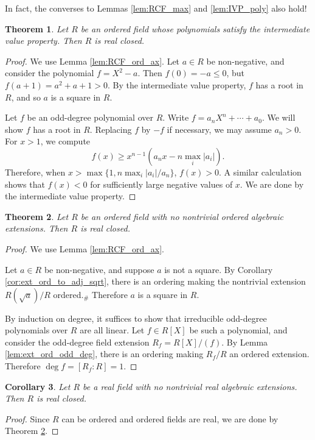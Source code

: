 \documentclass[a4paper]{report}
\newtheorem{theorem}{Theorem}
\newtheorem{corollary}[theorem]{Corollary}
\theoremstyle{definition}
\begin{document}
In fact, the converses to Lemmas \ref{lem:RCF_max} and \ref{lem:IVP_poly} also hold!

\begin{theorem}
  \label{thm:IVP_poly_imp_RCF}
  Let $R$ be an ordered field whose polynomials satisfy the intermediate value property. Then $R$ is real closed.
\end{theorem}
\begin{proof}
  We use Lemma \ref{lem:RCF_ord_ax}. Let $a\in R$ be non-negative, and consider the polynomial $f=X^2-a$. Then $f(0)=-a\leq0$, but $f(a+1)=a^2+a+1>0$. By the intermediate value property, $f$ has a root in $R$, and so $a$ is a square in $R$.

  Let $f$ be an odd-degree polynomial over $R$. Write $f=a_nX^n+\cdots+a_0$. We will show $f$ has a root in $R$. Replacing $f$ by $-f$ if necessary, we may assume $a_n>0$. For $x>1$, we compute
  \[f(x)\geq x^{n-1}(a_nx-n\max_i|a_i|).\]
  Therefore, when $x>\max\{1,n\max_i|a_i|/a_n\}$, $f(x)>0$. A similar calculation shows that $f(x)<0$ for sufficiently large negative values of $x$. We are done by the intermediate value property.
\end{proof}

\begin{theorem}
  \label{thm:ord_max_imp_RCF}
  Let $R$ be an ordered field with no nontrivial ordered algebraic extensions. Then $R$ is real closed.
\end{theorem}
\begin{proof}
  We use Lemma \ref{lem:RCF_ord_ax}. 

  Let $a\in R$ be non-negative, and suppose $a$ is not a square. By Corollary \ref{cor:ext_ord_to_adj_sqrt}, there is an ordering making the nontrivial extension $R(\sqrt{a})/R$ ordered.$_\#$ Therefore $a$ is a square in $R$.

  By induction on degree, it suffices to show that irreducible odd-degree polynomials over $R$ are all linear. Let $f\in R[X]$ be such a polynomial, and consider the odd-degree field extension $R_f=R[X]/(f)$. By Lemma \ref{lem:ext_ord_odd_deg}, there is an ordering making $R_f/R$ an ordered extension. Therefore $\deg f=[R_f:R]=1$.
\end{proof}

\begin{corollary}
  \label{cor:real_max_imp_RCF}
  Let $R$ be a real field with no nontrivial real algebraic extensions. Then $R$ is real closed.
\end{corollary}
\begin{proof}
  Since $R$ can be ordered and ordered fields are real, we are done by Theorem \ref{thm:ord_max_imp_RCF}.
\end{proof}
\end{document}
